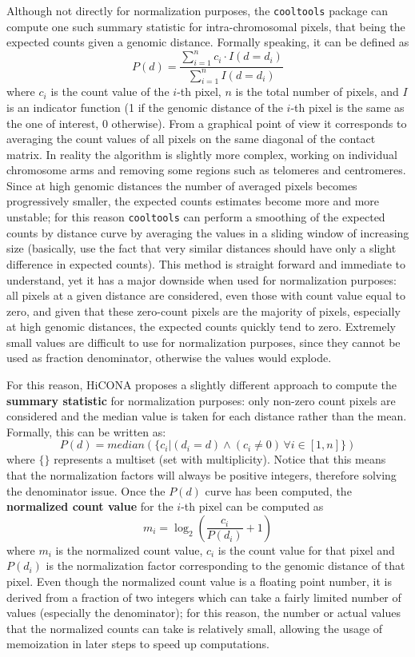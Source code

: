 Although not directly for normalization purposes, the \texttt{cooltools} package\cite{cooltools2022} can compute one such summary statistic for intra-chromosomal pixels, that being the expected counts given a genomic distance. Formally speaking, it can be defined as
$$P\left(d\right) = \frac{\sum_{i=1}^n c_i \cdot I(d = d_i)}{\sum_{i=1}^n I(d = d_i)}$$
where $c_i$ is the count value of the $i$-th pixel, $n$ is the total number of pixels, and $I$ is an indicator function (1 if the genomic distance of the $i$-th pixel is the same as the one of interest, 0 otherwise). From a graphical point of view it corresponds to averaging the count values of all pixels on the same diagonal of the contact matrix. In reality the algorithm is slightly more complex, working on individual chromosome arms and removing some regions such as telomeres and centromeres. Since at high genomic distances the number of averaged pixels becomes progressively smaller, the expected counts estimates become more and more unstable; for this reason \texttt{cooltools} can perform a smoothing of the expected counts by distance curve by averaging the values in a sliding window of increasing size (basically, use the fact that very similar distances should have only a slight difference in expected counts). 
This method is straight forward and immediate to understand, yet it has a major downside when used for normalization purposes: all pixels at a given distance are considered, even those with count value equal to zero, and given that these zero-count pixels are the majority of pixels, especially at high genomic distances, the expected counts quickly tend to zero. Extremely small values are difficult to use for normalization purposes, since they cannot be used as fraction denominator, otherwise the values would explode.

For this reason, HiCONA proposes a slightly different approach to compute the \textbf{summary statistic} for normalization purposes: only non-zero count pixels are considered and the median value is taken for each distance rather than the mean. Formally, this can be written as:
$$P\left(d\right) = median(\{c_i|(d_i=d) \land (c_i \neq 0) \, \forall i \in [1,n]\})$$ 
where $\{\}$ represents a multiset (set with multiplicity).
Notice that this means that the normalization factors will always be positive integers, therefore solving the denominator issue. Once the $P(d)$ curve has been computed, the \textbf{normalized count value} for the $i$-th pixel can be computed as
$$m_i = \log_2 \left(\frac{c_i}{P(d_i)} + 1\right)$$
where $m_i$ is the normalized count value, $c_i$ is the count value for that pixel and $P(d_i)$ is the normalization factor corresponding to the genomic distance of that pixel. Even though the normalized count value is a floating point number, it is derived from a fraction of two integers which can take a fairly limited number of values (especially the denominator); for this reason, the number or actual values that the normalized counts can take is relatively small, allowing the usage of memoization in later steps to speed up computations.

